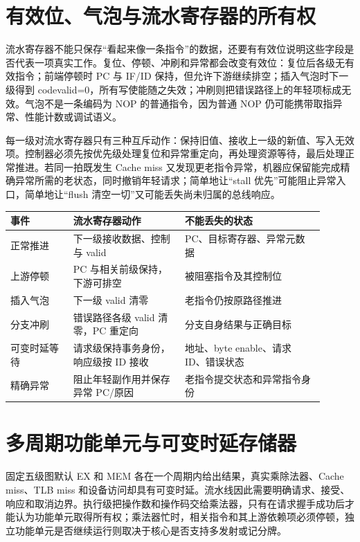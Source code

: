 \section{有效位、气泡与流水寄存器的所有权}

流水寄存器不能只保存“看起来像一条指令”的数据，还要有有效位说明这些字段是否代表一项真实工作。复位、停顿、冲刷和异常都会改变有效位：复位后各级无有效指令；前端停顿时 PC 与 IF/ID 保持，但允许下游继续排空；插入气泡时下一级得到 code{valid=0}，所有写使能随之失效；冲刷则把错误路径上的年轻项标成无效。气泡不是一条编码为 NOP 的普通指令，因为普通 NOP 仍可能携带取指异常、性能计数或调试语义。

每一级对流水寄存器只有三种互斥动作：保持旧值、接收上一级的新值、写入无效项。控制器必须先按优先级处理复位和异常重定向，再处理资源等待，最后处理正常推进。若同一拍既发生 Cache miss 又发现更老指令异常，机器应保留能完成精确异常所需的老状态，同时撤销年轻请求；简单地让“stall 优先”可能阻止异常入口，简单地让“flush 清空一切”又可能丢失尚未归属的总线响应。

\begin{longtable}{L{0.18\linewidth}L{0.32\linewidth}L{0.40\linewidth}}
\toprule
事件 & 流水寄存器动作 & 不能丢失的状态 \\
\midrule
正常推进 & 下一级接收数据、控制与 valid & PC、目标寄存器、异常元数据 \\
上游停顿 & PC 与相关前级保持，下游可排空 & 被阻塞指令及其控制位 \\
插入气泡 & 下一级 valid 清零 & 老指令仍按原路径推进 \\
分支冲刷 & 错误路径各级 valid 清零，PC 重定向 & 分支自身结果与正确目标 \\
可变时延等待 & 请求级保持事务身份，响应级按 ID 接收 & 地址、byte enable、请求 ID、错误状态 \\
精确异常 & 阻止年轻副作用并保存异常 PC/原因 & 老指令提交状态和异常指令身份 \\
\bottomrule
\end{longtable}

\section{多周期功能单元与可变时延存储器}

固定五级图默认 EX 和 MEM 各在一个周期内给出结果，真实乘除法器、Cache miss、TLB miss 和设备访问却具有可变时延。流水线因此需要明确请求、接受、响应和取消边界。执行级把操作数和操作码交给乘法器，只有在请求握手成功后才能认为功能单元取得所有权；乘法器忙时，相关指令和其上游依赖项必须停顿，独立功能单元是否继续运行则取决于核心是否支持多发射或记分牌。

